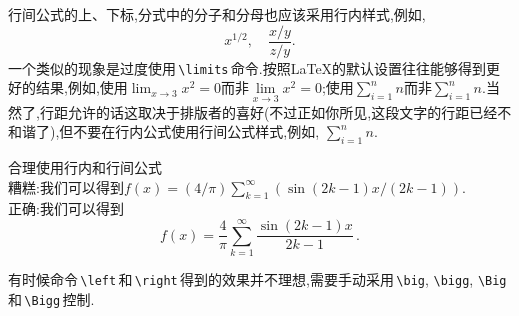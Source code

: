 \documentclass[a4paper]{article}
\newcommand{\mpunct}[1]{\,#1}                         %
\begin{document}
\begin{compactitem}[\hspace{1.02em}$\bullet$]
	行间公式的上、下标,分式中的分子和分母也应该采用行内样式,例如,
	$$x^{1/2},\quad \frac{x/y}{z/y}.$$
	一个类似的现象是过度使用\,\verb|\limits|\,命令.按照\LaTeX{}的默认设置往往能够得到更好的结果,例如,使用$\lim_{x\to 3}x^2=0$而非$\lim\limits_{x\to 3}x^2=0$;使用$\sum_{i=1}^n n$而非$\sum\limits_{i=1}^n n$.当然了,行距允许的话这取决于排版者的喜好(不过正如你所见,这段文字的行距已经不和谐了),但不要在行内公式使用行间公式样式,例如, $\displaystyle \sum_{i=1}^n n$.
	\item 合理使用行内和行间公式\\
	\textsf{糟糕}:我们可以得到$f(x)=(4 / \pi) \sum_{k=1}^{\infty}\left(\sin \left(2 k-1\right) x /\left(2 k-1\right)\right)$.\\
	\textsf{正确}:我们可以得到
	$$
	f(x)=\frac{4}{\pi} \sum_{k=1}^{\infty} \frac{\sin (2 k-1) x}{2 k-1}\mpunct{.}
	$$
	\item 有时候命令\,\verb|\left|\,和\,\verb|\right|\,得到的效果并不理想,需要手动采用\,\verb|\big|, \verb|\bigg|, \verb|\Big|和\,\verb|\Bigg|\,控制.\eop
\end{compactitem}
\end{document}

